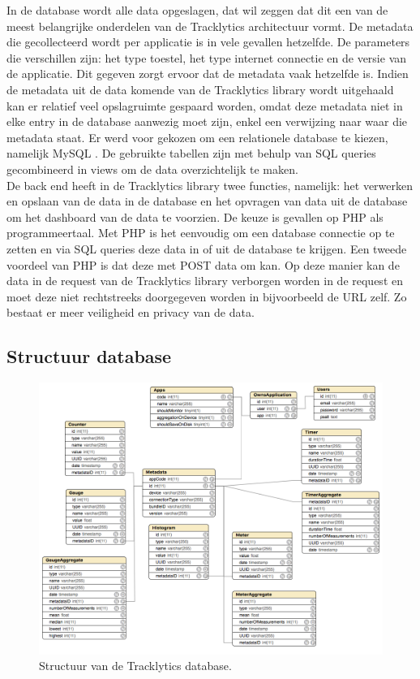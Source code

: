 In de database wordt alle data opgeslagen, dat wil zeggen dat dit een van de meest belangrijke onderdelen van de Tracklytics architectuur vormt. De metadata die gecollecteerd wordt per applicatie is in vele gevallen hetzelfde. De parameters die verschillen zijn: het type toestel, het type internet connectie en de versie van de applicatie. Dit gegeven zorgt ervoor dat de metadata vaak hetzelfde is. Indien de metadata uit de data komende van de Tracklytics library wordt uitgehaald kan er relatief veel opslagruimte gespaard worden, omdat deze metadata niet in elke entry in de database aanwezig moet zijn, enkel een verwijzing naar waar die metadata staat. Er werd voor gekozen om een relationele database te kiezen, namelijk MySQL \cite{MySQL}. De gebruikte tabellen zijn met behulp van SQL queries gecombineerd in views om de data overzichtelijk te maken. \\

De back end heeft in de Tracklytics library twee functies, namelijk: het verwerken en opslaan van de data in de database en het opvragen van data uit de database om het dashboard van de data te voorzien. De keuze is gevallen op PHP \cite{PHP} als programmeertaal. Met PHP is het eenvoudig om een database connectie op te zetten en via SQL queries deze data in of uit de database te krijgen. Een tweede voordeel van PHP is dat deze met POST data om kan. Op deze manier kan de data in de request van de Tracklytics library verborgen worden in de request en moet deze niet rechtstreeks doorgegeven worden in bijvoorbeeld de URL zelf. Zo bestaat er meer veiligheid en privacy van de data. \\

\subsection{Structuur database}
\begin{figure}[!h]
  \centering
  \includegraphics[scale=0.4]{Afbeeldingen/Implementatie/DatabaseDiagram}
  \caption{Structuur van de Tracklytics database.}
  \label{fig:database}
\end{figure}

